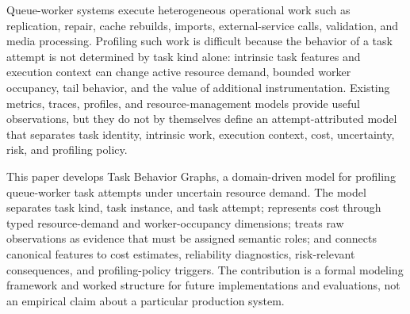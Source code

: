 Queue-worker systems execute heterogeneous operational work such as replication,
repair, cache rebuilds, imports, external-service calls, validation, and media
processing. Profiling such work is difficult because the behavior of a task
attempt is not determined by task kind alone: intrinsic task features and
execution context can change active resource demand, bounded worker occupancy,
tail behavior, and the value of additional instrumentation. Existing metrics,
traces, profiles, and resource-management models provide useful observations,
but they do not by themselves define an attempt-attributed model that separates
task identity, intrinsic work, execution context, cost, uncertainty, risk, and
profiling policy.

This paper develops Task Behavior Graphs, a domain-driven model for profiling
queue-worker task attempts under uncertain resource demand. The model separates
task kind, task instance, and task attempt; represents cost through typed
resource-demand and worker-occupancy dimensions; treats raw observations as
evidence that must be assigned semantic roles; and connects canonical features
to cost estimates, reliability diagnostics, risk-relevant consequences, and
profiling-policy triggers. The contribution is a formal modeling framework and
worked structure for future implementations and evaluations, not an empirical
claim about a particular production system.
